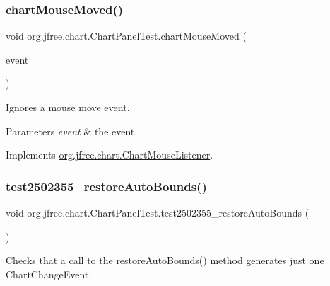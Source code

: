 \subsubsection{\texorpdfstring{chart\+Mouse\+Moved()}{chartMouseMoved()}}
{\footnotesize\ttfamily void org.\+jfree.\+chart.\+Chart\+Panel\+Test.\+chart\+Mouse\+Moved (\begin{DoxyParamCaption}\item[{\mbox{\hyperlink{classorg_1_1jfree_1_1chart_1_1_chart_mouse_event}{Chart\+Mouse\+Event}}}]{event }\end{DoxyParamCaption})}

Ignores a mouse move event.


\begin{DoxyParams}{Parameters}
{\em event} & the event. \\
\hline
\end{DoxyParams}


Implements \mbox{\hyperlink{interfaceorg_1_1jfree_1_1chart_1_1_chart_mouse_listener_acc035e045f3d957c0ce9e6b5ab4fbecd}{org.\+jfree.\+chart.\+Chart\+Mouse\+Listener}}.

\mbox{\label{classorg_1_1jfree_1_1chart_1_1_chart_panel_test_ae86c70691776fe374c1a3b580df79357}} 
\subsubsection{\texorpdfstring{test2502355\+\_\+restore\+Auto\+Bounds()}{test2502355\_restoreAutoBounds()}}
{\footnotesize\ttfamily void org.\+jfree.\+chart.\+Chart\+Panel\+Test.\+test2502355\+\_\+restore\+Auto\+Bounds (\begin{DoxyParamCaption}{ }\end{DoxyParamCaption})}

Checks that a call to the restore\+Auto\+Bounds() method generates just one Chart\+Change\+Event. \mbox{\label{classorg_1_1jfree_1_1chart_1_1_chart_panel_test_ab092893ad985ac15bb2177b61d55b3ac}} 
